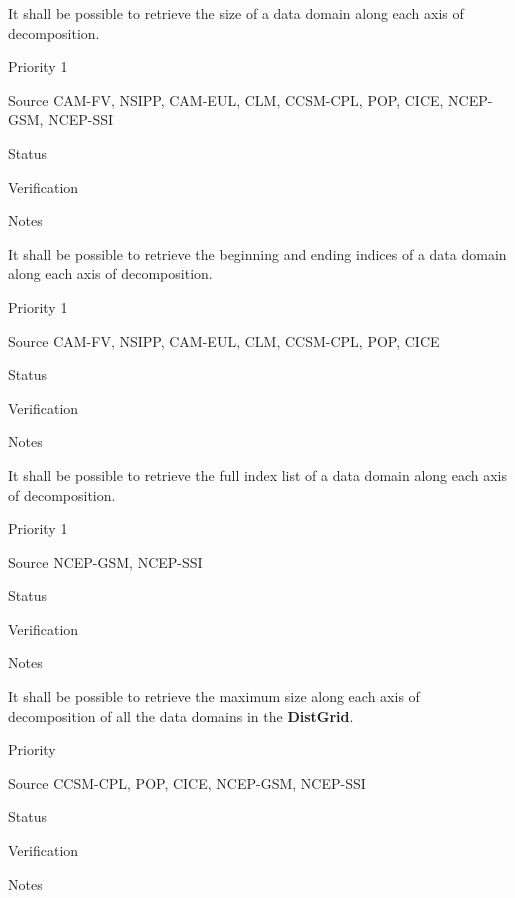 

It shall be possible to retrieve the size of a data domain
along each axis of decomposition.

\begin{reqlist}
\item[Priority] 1
\item[Source] CAM-FV, NSIPP, CAM-EUL, CLM, CCSM-CPL, POP, CICE, NCEP-GSM, NCEP-SSI
\item[Status]
\item[Verification]
\item[Notes]
\end{reqlist}


It shall be possible to retrieve the beginning and ending indices of a
data domain along each axis of decomposition.

\begin{reqlist}
\item[Priority] 1
\item[Source] CAM-FV, NSIPP, CAM-EUL, CLM, CCSM-CPL, POP, CICE
\item[Status]
\item[Verification]
\item[Notes]
\end{reqlist}


It shall be possible to retrieve the full index list of a
data domain along each axis of decomposition.

\begin{reqlist}
\item[Priority] 1
\item[Source] NCEP-GSM, NCEP-SSI
\item[Status]
\item[Verification]
\item[Notes]
\end{reqlist}


It shall be possible to retrieve the maximum size along each axis of
decomposition of all the data domains in the \textbf{DistGrid}. 

\begin{reqlist}
\item[Priority]
\item[Source] CCSM-CPL, POP, CICE, NCEP-GSM, NCEP-SSI
\item[Status]
\item[Verification]
\item[Notes]
\end{reqlist}

